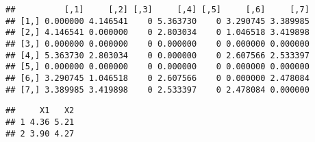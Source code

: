 \documentclass[12pt]{report}\usepackage[]{graphicx}\usepackage[dvipsnames]{xcolor}
\makeatletter
\newenvironment{kframe}{%
 \def\at@end@of@kframe{}%
 \ifinner\ifhmode%
  \def\at@end@of@kframe{\end{minipage}}%
  \begin{minipage}{\columnwidth}%
 \fi\fi%
 \def\FrameCommand##1{\hskip\@totalleftmargin \hskip-\fboxsep
 \colorbox{shadecolor}{##1}\hskip-\fboxsep
     \hskip-\linewidth \hskip-\@totalleftmargin \hskip\columnwidth}%
 \MakeFramed {\advance\hsize-\width
   \@totalleftmargin\z@ \linewidth\hsize
   \@setminipage}}%
 {\par\unskip\endMakeFramed%
 \at@end@of@kframe}
\newenvironment{knitrout}{}{} %
\makeatother
\begin{document}
\begin{knitrout}
\begin{kframe}
{\ttfamily\noindent\itshape\color{messagecolor}{\#\# STEP => 2}}

{\ttfamily\noindent\itshape\color{messagecolor}{\#\# \\\#\# \ Matrix Distance (distance type = EUC, approach type = MIN):}}\begin{verbatim}
##          [,1]     [,2] [,3]     [,4] [,5]     [,6]     [,7]
## [1,] 0.000000 4.146541    0 5.363730    0 3.290745 3.389985
## [2,] 4.146541 0.000000    0 2.803034    0 1.046518 3.419898
## [3,] 0.000000 0.000000    0 0.000000    0 0.000000 0.000000
## [4,] 5.363730 2.803034    0 0.000000    0 2.607566 2.533397
## [5,] 0.000000 0.000000    0 0.000000    0 0.000000 0.000000
## [6,] 3.290745 1.046518    0 2.607566    0 0.000000 2.478084
## [7,] 3.389985 3.419898    0 2.533397    0 2.478084 0.000000
\end{verbatim}


{\ttfamily\noindent\itshape\color{messagecolor}{\#\# \\\#\# \ The minimum distance is: 1.04651803615609}}

{\ttfamily\noindent\itshape\color{messagecolor}{\#\# \\\#\# \ The closest clusters are: 2, 6}}

{\ttfamily\noindent\itshape\color{messagecolor}{\#\# \\\#\# \ The grouped clusters are added to the solution.}}

{\ttfamily\noindent\itshape\color{messagecolor}{\#\# \\\#\# \ Grouping clusters 2 and cluster 6, it is created a new cluster:}}\begin{verbatim}
##     X1   X2
## 1 4.36 5.21
## 2 3.90 4.27
\end{verbatim}


{\ttfamily\noindent\itshape\color{messagecolor}{\#\# \\\#\# \ The new cluster is added to the solution.}}

{\ttfamily\noindent\itshape\color{messagecolor}{\#\# \\\#\# \_\_\_\_\_\_\_\_\_\_\_\_\_\_\_\_\_\_\_\_\_\_\_\_\_\_\_\_\_\_\_\_\_\_\_\_\_\_\_\_\_\_\_\_\_\_\_\_\_\_\_\_\_\_\_\_\_\_\_\_\_\_\_\_\_\_\_\_\_\_\_\_\_\_\_\_\_\_\_\_\_\_\_\_\_\_\_\_\_\_\_\_\_}}

{\ttfamily\noindent\itshape\color{messagecolor}{\#\# STEP => 3}}


\end{kframe}
\end{knitrout}
\end{document}
